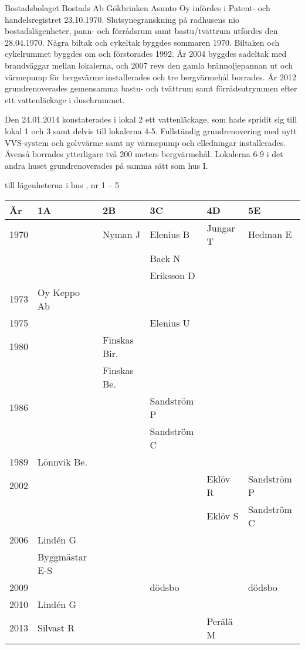 Bostadsbolaget Bostads Ab Gökbrinken Asunto Oy infördes i Patent- och handelsregistret 23.10.1970. Slutsynegranskning på radhusens nio bostadslägenheter, pann- och förrådsrum samt bastu/tvättrum utfördes den 28.04.1970. Några biltak och cykeltak byggdes sommaren 1970. Biltaken och cykelrummet byggdes om och förstorades 1992. År 2004 byggdes sadeltak med brandväggar mellan lokalerna, och 2007 revs den gamla brännoljepannan ut och värmepump för bergsvärme installerades och tre bergvärmehål borrades. År 2012 grundrenoverades gemensamma bastu- och tvättrum samt förrådsutrymmen efter ett vattenläckage i duschrummet.


Den 24.01.2014 konstaterades i lokal 2 ett vattenläckage, som hade spridit sig till lokal 1 och 3 samt delvis till lokalerna 4-5. Fullständig grundrenovering med nytt VVS-system och golvvärme samt ny värmepump och elledningar installerades. Ävenså borrades ytterligare två 200 meters bergvärmehål. Lokalerna 6-9 i det andra huset grundrenoverades på samma sätt som hus I.

 till lägenheterna i hus , nr 1 – 5
\begin{center}
  \begin{tabular}{l l l l l l}
    År & 1A & 2B & 3C & 4D & 5E \\ \hline
    1970 &  & Nyman J & Elenius B & Jungar T & Hedman E \\
      &  &  & Back N &  &  \\
      &  &  & Eriksson D &  &  \\
    1973 & Oy Keppo Ab &   &   &   &   \\
    1975 &   &   & Elenius U &   &   \\
    1980 &   & Finskas Bir. &   &   &   \\
      &   & Finskas Be. &   &   &   \\
    1986 &   &   & Sandström P &   &   \\
      &   &   & Sandström C &   &   \\
    1989 & Lönnvik Be. &   &   &   &   \\
    2002 &   &   &   & Eklöv R & Sandström P \\
      &   &   &   & Eklöv S & Sandström C \\
    2006 & Lindén G &   &   &   &   \\
      & Byggmästar E-S &   &   &   &   \\
    2009 &   &   & dödsbo &   & dödsbo \\
    2010 & Lindén G &   &   &   &   \\
    2013 & Silvast R &   &   & Perälä M &   \\
  \end{tabular}
\end{center}



